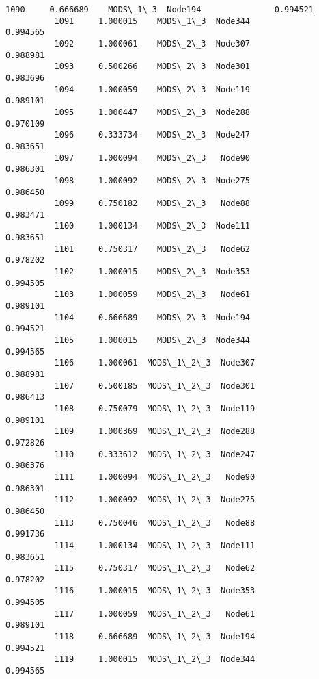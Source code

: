 \documentclass[11pt]{article}
\begin{document}
\begin{Verbatim}[commandchars=\\\{\}]
          1090     0.666689    MODS\_1\_3  Node194               0.994521   
          1091     1.000015    MODS\_1\_3  Node344               0.994565   
          1092     1.000061    MODS\_2\_3  Node307               0.988981   
          1093     0.500266    MODS\_2\_3  Node301               0.983696   
          1094     1.000059    MODS\_2\_3  Node119               0.989101   
          1095     1.000447    MODS\_2\_3  Node288               0.970109   
          1096     0.333734    MODS\_2\_3  Node247               0.983651   
          1097     1.000094    MODS\_2\_3   Node90               0.986301   
          1098     1.000092    MODS\_2\_3  Node275               0.986450   
          1099     0.750182    MODS\_2\_3   Node88               0.983471   
          1100     1.000134    MODS\_2\_3  Node111               0.983651   
          1101     0.750317    MODS\_2\_3   Node62               0.978202   
          1102     1.000015    MODS\_2\_3  Node353               0.994505   
          1103     1.000059    MODS\_2\_3   Node61               0.989101   
          1104     0.666689    MODS\_2\_3  Node194               0.994521   
          1105     1.000015    MODS\_2\_3  Node344               0.994565   
          1106     1.000061  MODS\_1\_2\_3  Node307               0.988981   
          1107     0.500185  MODS\_1\_2\_3  Node301               0.986413   
          1108     0.750079  MODS\_1\_2\_3  Node119               0.989101   
          1109     1.000369  MODS\_1\_2\_3  Node288               0.972826   
          1110     0.333612  MODS\_1\_2\_3  Node247               0.986376   
          1111     1.000094  MODS\_1\_2\_3   Node90               0.986301   
          1112     1.000092  MODS\_1\_2\_3  Node275               0.986450   
          1113     0.750046  MODS\_1\_2\_3   Node88               0.991736   
          1114     1.000134  MODS\_1\_2\_3  Node111               0.983651   
          1115     0.750317  MODS\_1\_2\_3   Node62               0.978202   
          1116     1.000015  MODS\_1\_2\_3  Node353               0.994505   
          1117     1.000059  MODS\_1\_2\_3   Node61               0.989101   
          1118     0.666689  MODS\_1\_2\_3  Node194               0.994521   
          1119     1.000015  MODS\_1\_2\_3  Node344               0.994565   
          

\end{Verbatim}
\end{document}
